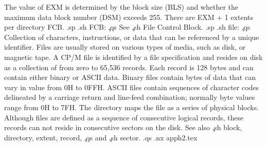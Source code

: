 The value of EXM is determined by the block size (BLS) and 
whether the maximum data block number (DSM) exceeds 255.  There 
are EXM + 1 extents per directory FCB.
.sp
.sh
FCB:  \c
.qs
See \c
.sh
File Control Block.
.sp
.sh
file:  \c
.qs
Collection of characters, instructions, or data that can be 
referenced by a unique identifier.  Files are usually stored on 
various types of media, such as disk, or magnetic 
tape.  A CP/M file is identified by a file specification and 
resides on disk as a collection of from zero to 65,536 records.  
Each record is 128 bytes and can contain either binary or ASCII 
data.  Binary files contain bytes of data that can vary in value 
from 0H to 0FFH.  ASCII files contain sequences of character 
codes delineated by a carriage return and line-feed combination; 
normally byte values range from 0H to 7FH.  The directory maps 
the file as a series of physical blocks.  Although files are 
defined as a sequence of consecutive logical records, these 
records can not reside in consecutive sectors on the disk.  See 
also \c
.sh
block, directory, extent, record, \c
.qs
and \c
.sh
sector.
.qs
.nx apph2.tex
 